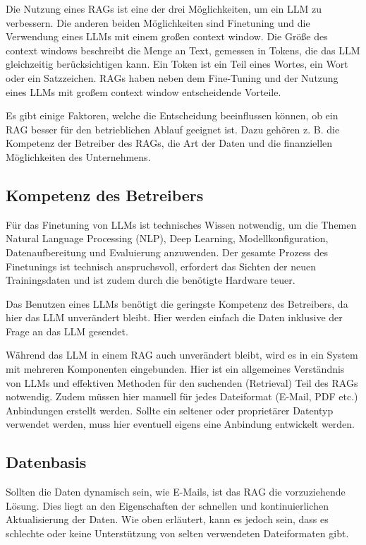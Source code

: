 Die Nutzung eines RAGs ist eine der drei Möglichkeiten, um ein LLM zu verbessern. Die anderen beiden Möglichkeiten sind Finetuning und die Verwendung eines LLMs mit einem großen context window.
Die Größe des context windows beschreibt die Menge an Text, gemessen in Tokens, die das LLM gleichzeitig berücksichtigen kann. Ein Token ist ein Teil eines Wortes, ein Wort oder ein Satzzeichen.
RAGs haben neben dem Fine-Tuning und der Nutzung eines LLMs mit großem context window entscheidende Vorteile.

Es gibt einige Faktoren, welche die Entscheidung beeinflussen können, ob ein RAG besser für den betrieblichen Ablauf geeignet ist.
Dazu gehören z. B. die Kompetenz der Betreiber des RAGs, die Art der Daten und die finanziellen Möglichkeiten des Unternehmens.


\subsection{Kompetenz des Betreibers}
Für das Finetuning von LLMs ist technisches Wissen notwendig, um die Themen Natural Language Processing (NLP), Deep Learning, Modellkonfiguration, Datenaufbereitung und Evaluierung anzuwenden.
Der gesamte Prozess des Finetunings ist technisch anspruchsvoll, erfordert das Sichten der neuen Trainingsdaten und ist zudem durch die benötigte Hardware teuer.

Das Benutzen eines LLMs benötigt die geringste Kompetenz des Betreibers, da hier das LLM unverändert bleibt. Hier werden einfach die Daten inklusive der Frage an das LLM gesendet.

Während das LLM in einem RAG auch unverändert bleibt, wird es in ein System mit mehreren Komponenten eingebunden.
Hier ist ein allgemeines Verständnis von LLMs und effektiven Methoden für den suchenden (Retrieval) Teil des RAGs notwendig.
Zudem müssen hier manuell für jedes Dateiformat (E-Mail, PDF etc.) Anbindungen erstellt werden. Sollte ein seltener oder proprietärer Datentyp verwendet werden, muss hier eventuell eigens eine Anbindung entwickelt werden.
\subsection{Datenbasis}
Sollten die Daten dynamisch sein, wie E-Mails, ist das RAG die vorzuziehende Lösung. Dies liegt an den Eigenschaften der schnellen und kontinuierlichen Aktualisierung der Daten.
Wie oben erläutert, kann es jedoch sein, dass es schlechte oder keine Unterstützung von selten verwendeten Dateiformaten gibt.

